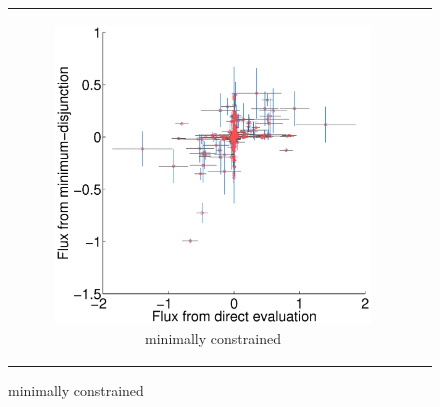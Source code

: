 \documentclass[compress]{beamer}
\begin{document}
{\begin{figure}
\begin{tabular}{cc}
\begin{subfigure}[b]{0.5\textwidth}
  \includegraphics[width=\textwidth, trim=9cm 0cm 9cm 0cm, clip=true]
  {expCmpR2dC}
  \caption{minimally constrained}
  \end{subfigure} 
\\
\end{tabular}
\vspace{-4mm}
\label{fig:EnzAbundEvalYCmp}
\end{figure}
}


\end{document}
